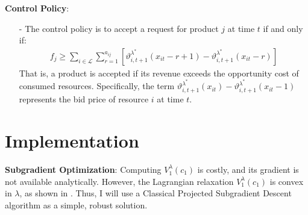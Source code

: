 \documentclass[11pt]{article}
\begin{document}
\vspace{0.5cm}

\noindent
\textbf{Control Policy}:
\begin{itemize}
\item[-] The control policy is to accept a request for product $j$ at time $t$ if and only if:
    \begin{align*}
        f_j \geq \sum_{i \in \mathcal{L}} \sum_{r = 1}^{a_{ij}} \left[ \vartheta^{\lambda^{*}}_{i,t+1}(x_{it} - r + 1) - \vartheta^{\lambda^{*}}_{i,t+1}(x_{it} - r) \right]
    \end{align*}
    That is, a product is accepted if its revenue exceeds the opportunity cost of consumed resources. 
    Specifically, the term $\vartheta^{\lambda^{*}}_{i,t+1}(x_{it}) - \vartheta^{\lambda^{*}}_{i,t+1}(x_{it} - 1)$ represents the bid price of resource $i$ at time $t$.
\end{itemize}


\vspace{0.5cm}




\section{Implementation}

\vspace{0.5cm}

\noindent
\textbf{Subgradient Optimization}: 
Computing $V^{\lambda}_{1}(c_{1})$ is costly, and its gradient is not available analytically.
However, the Lagrangian relaxation $V^{\lambda}_{1}(c_{1})$ is convex in $\lambda$, as shown in \cite{topaloglu2009using}. 
Thus, I will use a Classical Projected Subgradient Descent algorithm as a simple, robust solution.
\end{document}
